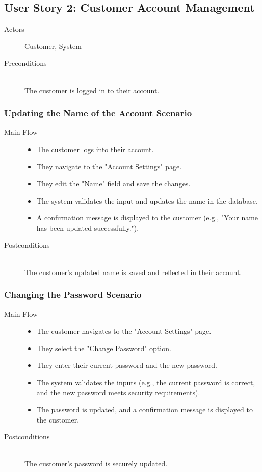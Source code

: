 \documentclass[a4paper,journal]{IEEEtran}
\begin{document}
\subsection{User Story 2: Customer Account Management}
\begin{description}
  \item[Actors] Customer, System
  \item[Preconditions] \hfill \\
    The customer is logged in to their account.
\end{description}
\subsubsection{Updating the Name of the Account Scenario}
\begin{description}
  \item[Main Flow] \hfill
  \begin{itemize}
    \item The customer logs into their account.
    \item They navigate to the "Account Settings" page.
    \item They edit the "Name" field and save the changes.
    \item The system validates the input and updates the name in the database.
    \item A confirmation message is displayed to the customer
      (e.g., "Your name has been updated successfully.").
  \end{itemize}
  \item[Postconditions] \hfill \\
    The customer's updated name is saved and reflected in their account.
\end{description}
\subsubsection{Changing the Password Scenario}
\begin{description}
  \item[Main Flow] \hfill
  \begin{itemize}
    \item The customer navigates to the "Account Settings" page.
    \item They select the "Change Password" option.
    \item They enter their current password and the new password.
    \item The system validates the inputs (e.g., the current password is
      correct, and the new password meets security requirements).
    \item The password is updated, and a confirmation message is displayed to
      the customer.
  \end{itemize}
  \item[Postconditions] \hfill \\
    The customer's password is securely updated.
\end{description}
\end{document}
